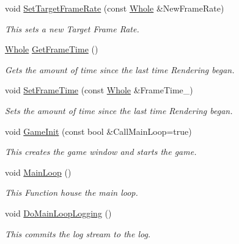 \begin{DoxyCompactItemize}
void \hyperlink{classphys_1_1World_a76dfcde35392291aafd6eb1a64b3c95c}{SetTargetFrameRate} (const \hyperlink{namespacephys_a460f6bc24c8dd347b05e0366ae34f34a}{Whole} \&NewFrameRate)
\begin{DoxyCompactList}\small\item\em This sets a new Target Frame Rate. \item\end{DoxyCompactList}\item 
\hyperlink{namespacephys_a460f6bc24c8dd347b05e0366ae34f34a}{Whole} \hyperlink{classphys_1_1World_a348cebf8f15202a9916ac1b2400c63b1}{GetFrameTime} ()
\begin{DoxyCompactList}\small\item\em Gets the amount of time since the last time Rendering began. \item\end{DoxyCompactList}\item 
void \hyperlink{classphys_1_1World_a0168122baeb30d4b90ddecdda46c8fea}{SetFrameTime} (const \hyperlink{namespacephys_a460f6bc24c8dd347b05e0366ae34f34a}{Whole} \&FrameTime\_\-)
\begin{DoxyCompactList}\small\item\em Sets the amount of time since the last time Rendering began. \item\end{DoxyCompactList}\item 
void \hyperlink{classphys_1_1World_a21cc36be08a61f40619584d4c438936b}{GameInit} (const bool \&CallMainLoop=true)
\begin{DoxyCompactList}\small\item\em This creates the game window and starts the game. \item\end{DoxyCompactList}\item 
void \hyperlink{classphys_1_1World_af1d9e36d43f5e50543fa2351a32c8362}{MainLoop} ()
\begin{DoxyCompactList}\small\item\em This Function house the main loop. \item\end{DoxyCompactList}\item 
void \hyperlink{classphys_1_1World_a1461e6c9d16214aa2cc310035b149378}{DoMainLoopLogging} ()
\begin{DoxyCompactList}\small\item\em This commits the log stream to the log. \item\end{DoxyCompactList}\item 

\end{DoxyCompactItemize}
